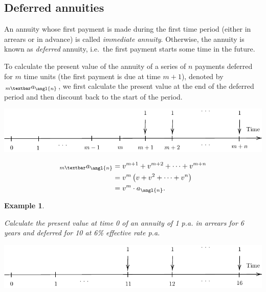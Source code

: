 \documentclass[landscape, 20pt]{extreport}
\theoremstyle{definition}
\theoremstyle{definition}
\newtheorem{example}{Example}[chapter]
\theoremstyle{definition}
\theoremstyle{definition}
\theoremstyle{remark}
\begin{document}
\newpage \hypertarget{deferred-annuities}{%
\subsection{Deferred annuities}\label{deferred-annuities}}

An annuity whose first payment is made during the first time period
(either in arrears or in advance) is called \emph{immediate annuity}.
Otherwise, the annuity is known as \emph{deferred} annuity, i.e.~the first
payment starts some time in the future.

To calculate the present value of the annuity of a series of \(n\)
payments deferred for \(m\) time units (the first payment is due at time
\(m+1\)), denoted by \(_{m \textbar}a_\angl{n}\), we first calculate the
present value at the end of the deferred period and then discount back
to the start of the period.

\begin{center}\includegraphics{tikz-ex17-1} \end{center}

\[\begin{aligned}
    _{m \textbar} a_\angl{n}  &= v^{m+1} + v^{m+2} + \cdots +v^{m+n}  \\
    &= v^m  \left( v + v^2 + \cdots + v^n  \right) \\
    &= v^m \cdot  a_\angl{n}.\end{aligned}\]

\newpage \begin{example}
\protect\hypertarget{exm:unlabeled-div-33}{}\label{exm:unlabeled-div-33}

\emph{Calculate the present value at time 0 of an annuity of 1 p.a. in
arrears for 6 years and deferred for 10 at 6\% effective rate p.a.}

\end{example}

\begin{center}\includegraphics{tikz-ex18-1} \end{center}
\end{document}
